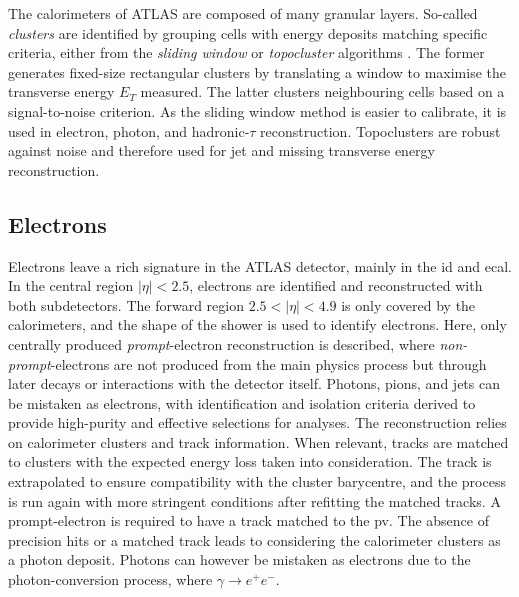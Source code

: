 The calorimeters of ATLAS are composed of many granular layers. So-called \textit{clusters} are identified by grouping cells with energy deposits matching specific criteria, either from the \textit{sliding window} or \textit{topocluster} algorithms \cite{Lampl:1099735}. The former generates fixed-size rectangular clusters by translating a window to maximise the transverse energy $E_T$ measured. The latter clusters neighbouring cells based on a signal-to-noise criterion. As the sliding window method is easier to calibrate, it is used in electron, photon, and hadronic-$\tau$ reconstruction. Topoclusters are robust against noise and therefore used for jet and missing transverse energy reconstruction.

\subsection{Electrons}\label{sec-atlas-el}
Electrons leave a rich signature in the ATLAS detector, mainly in the \gls{id} and \gls{ecal}. In the central region $|\eta| < 2.5$, electrons are identified and reconstructed with both subdetectors. The forward region $2.5 < |\eta| < 4.9$ is only covered by the calorimeters, and the shape of the shower is used to identify electrons. Here, only centrally produced \textit{prompt}-electron reconstruction is described, where \textit{non-prompt}-electrons are not produced from the main physics process but through later decays or interactions with the detector itself. Photons, pions, and jets can be mistaken as electrons, with identification and isolation criteria derived to provide high-purity and effective selections for analyses. The reconstruction relies on calorimeter clusters and track information. When relevant, tracks are matched to clusters with the expected energy loss taken into consideration. The track is extrapolated to ensure compatibility with the cluster barycentre, and the process is run again with more stringent conditions after refitting the matched tracks. A prompt-electron is required to have a track matched to the \gls{pv}. The absence of precision hits or a matched track leads to considering the calorimeter clusters as a photon deposit. Photons can however be mistaken as electrons due to the photon-conversion process, where $\gamma \rightarrow e^+e^-$. \\

